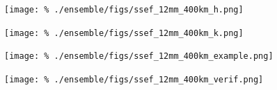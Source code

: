 \clearpage
\begin{figure}[cc]
    \centering
    \texttt{[image: \%
    ./ensemble/figs/ssef\_12mm\_400km\_h.png]}\\
    \caption{}
    \label{h-12mm-400km-dist}
\end{figure}


\clearpage
\begin{figure}[cc]
    \centering
    \texttt{[image: \%
    ./ensemble/figs/ssef\_12mm\_400km\_k.png]}\\
    \caption{}
    \label{k-12mm-400km-dist}
\end{figure}


\clearpage
\begin{figure}[cc]
    \centering
    \texttt{[image: \%
    ./ensemble/figs/ssef\_12mm\_400km\_example.png]}\\
    \caption{}
    \label{ssef-12mm-400km-example}
\end{figure}


\clearpage
\begin{figure}[cc]
    \centering
    \texttt{[image: \%
    ./ensemble/figs/ssef\_12mm\_400km\_verif.png]}\\
    \caption{}
    \label{ssef-400km-12mm-verif}
\end{figure}

